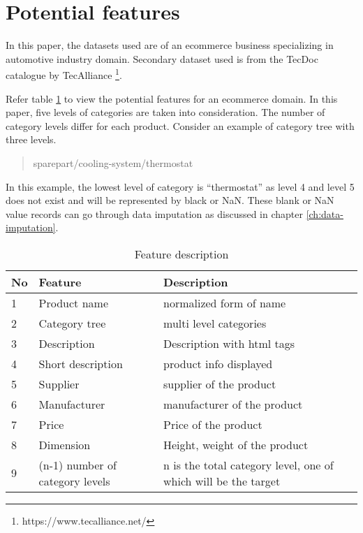 \section{Potential features}

In this paper, the datasets used are of an ecommerce business specializing in automotive industry domain. Secondary dataset used is from the TecDoc catalogue by TecAlliance \footnote{https://www.tecalliance.net/}. 

 Refer table \ref{table:feature_decription} to view the potential features for an ecommerce domain. In this paper, five levels of categories are taken into consideration. The number of category levels differ for each product. Consider an example of category tree with three levels. 

\begin{quote} 
\centering 
sparepart/cooling-system/thermostat
\end{quote}
In this example, the lowest level of category is ``thermostat'' as level 4 and level 5 does not exist and will be represented by black or NaN. These blank or NaN value records can go through data imputation as discussed in chapter \ref{ch:data-imputation}.



\begin{table}[h]
      \centering
      \caption{Feature description}
      \label{table:feature_decription}
      \begin{tabular}{ lll }
            \toprule
            
            \textbf{No}& \textbf{Feature} & \textbf{Description}\\
            \midrule
            1&Product name & normalized form of name\\
            2&Category tree & multi level categories\\
            3&Description & Description with html tags\\         
            4&Short description  & product info displayed\\
            5&Supplier  &  supplier of the product\\
            6&Manufacturer  &  manufacturer of the product\\           
            7&Price  &  Price of the product\\
            8&Dimension  & Height, weight of the product\\
            9&(n-1) number of  category levels   &  n is the total category level, one of which will be the target\\
           
            \bottomrule
            \end{tabular}


\end{table}


